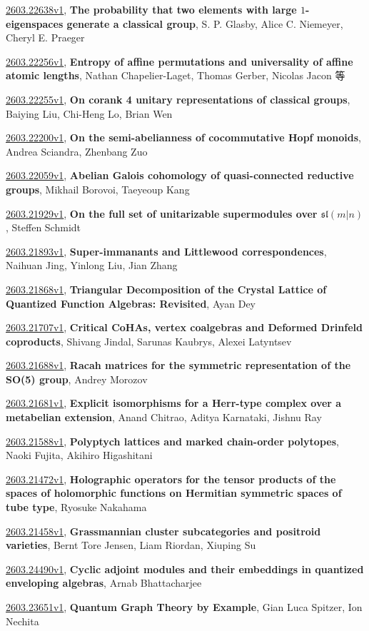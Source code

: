 \documentclass[9pt, a4paper]{article}
\theoremstyle{plain}
\theoremstyle{definition}
\theoremstyle{remark}
\newcommand{\arxiv}[3]{\href{https://arxiv.org/abs/#1}{#1}, \textbf{\textcolor{arxivblue}{#2}}, #3}
\begin{document}
\arxiv{2603.22638v1}{The probability that two elements with large $1$-eigenspaces generate a classical group}{S. P. Glasby, Alice C. Niemeyer, Cheryl E. Praeger}

\arxiv{2603.22256v1}{Entropy of affine permutations and universality of affine atomic lengths}{Nathan Chapelier-Laget, Thomas Gerber, Nicolas Jacon 等}

\arxiv{2603.22255v1}{On corank 4 unitary representations of classical groups}{Baiying Liu, Chi-Heng Lo, Brian Wen}

\arxiv{2603.22200v1}{On the semi-abelianness of cocommutative Hopf monoids}{Andrea Sciandra, Zhenbang Zuo}

\arxiv{2603.22059v1}{Abelian Galois cohomology of quasi-connected reductive groups}{Mikhail Borovoi, Taeyeoup Kang}

\arxiv{2603.21929v1}{On the full set of unitarizable supermodules over $\mathfrak{sl}(m\vert n)$}{Steffen Schmidt}

\arxiv{2603.21893v1}{Super-immanants and Littlewood correspondences}{Naihuan Jing, Yinlong Liu, Jian Zhang}

\arxiv{2603.21868v1}{Triangular Decomposition of the Crystal Lattice of Quantized Function Algebras: Revisited}{Ayan Dey}

\arxiv{2603.21707v1}{Critical CoHAs, vertex coalgebras and Deformed Drinfeld coproducts}{Shivang Jindal, Sarunas Kaubrys, Alexei Latyntsev}

\arxiv{2603.21688v1}{Racah matrices for the symmetric representation of the SO(5) group}{Andrey Morozov}

\arxiv{2603.21681v1}{Explicit isomorphisms for a Herr-type complex over a metabelian extension}{Anand Chitrao, Aditya Karnataki, Jishnu Ray}

\arxiv{2603.21588v1}{Polyptych lattices and marked chain-order polytopes}{Naoki Fujita, Akihiro Higashitani}

\arxiv{2603.21472v1}{Holographic operators for the tensor products of the spaces of holomorphic functions on Hermitian symmetric spaces of tube type}{Ryosuke Nakahama}

\arxiv{2603.21458v1}{Grassmannian cluster subcategories and positroid varieties}{Bernt Tore Jensen, Liam Riordan, Xiuping Su}

\arxiv{2603.24490v1}{Cyclic adjoint modules and their embeddings in quantized enveloping algebras}{Arnab Bhattacharjee}

\arxiv{2603.23651v1}{Quantum Graph Theory by Example}{Gian Luca Spitzer, Ion Nechita}
\end{document}
